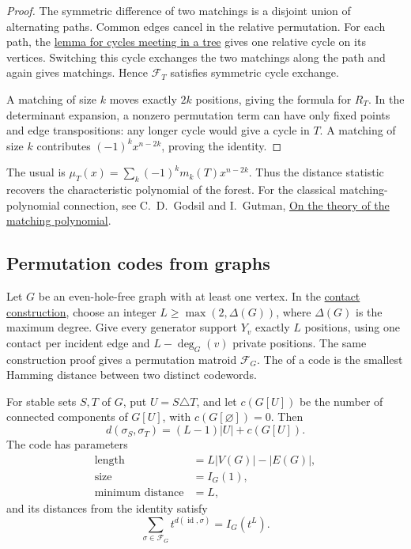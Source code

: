 \begin{proof}
The symmetric difference of two matchings is a disjoint union of
alternating paths. Common edges cancel in the relative permutation.
For each path, the \href{stable-sets.htm#contactConstruction}{lemma for
cycles meeting in a tree} gives one relative cycle on its vertices.
Switching this cycle
exchanges the two matchings along the path and again gives matchings.
Hence $\mathcal F_T$ satisfies symmetric cycle exchange.

A matching of size $k$ moves exactly $2k$ positions, giving the formula
for $R_T$. In the determinant expansion, a nonzero permutation term
can have only fixed points and edge transpositions: any longer cycle
would give a cycle in $T$. A matching of size $k$ contributes
$(-1)^kx^{n-2k}$, proving the identity.
\end{proof}

The usual  is
$\mu_T(x)=\sum_k(-1)^km_k(T)x^{n-2k}$. Thus the distance statistic
recovers the characteristic polynomial of the forest. For the classical
matching-polynomial connection, see C.~D.~Godsil and I.~Gutman,
\href{https://doi.org/10.1002/jgt.3190050203}{On the theory of the
matching polynomial}.

\subsection[graphPermutationCodes]{Permutation codes from graphs}

Let $G$ be an even-hole-free graph with at least one vertex. In the
\href{stable-sets.htm#contactConstruction}{contact construction}, choose
an integer $L\ge\max(2,\Delta(G))$, where $\Delta(G)$ is the maximum
degree. Give every generator support $Y_v$ exactly $L$ positions,
using one contact per incident edge and $L-\deg_G(v)$ private positions.
The same construction proof gives a permutation matroid $\mathcal F_G$.
The  of a code is the smallest Hamming distance
between two distinct codewords.

\begin{proposition}
For stable sets $S,T$ of $G$, put $U=S\triangle T$, and let $c(G[U])$
be the number of connected components of $G[U]$, with $c(G[\varnothing])=0$.
Then
\[
 d(\sigma_S,\sigma_T)=(L-1)|U|+c(G[U]).
\]
The code has parameters
\[
 \begin{aligned}
 \text{length}&=L|V(G)|-|E(G)|,\\
 \text{size}&=I_G(1),\\
 \text{minimum distance}&=L,
 \end{aligned}
\]
and its distances from the identity satisfy
\[
 \sum_{\sigma\in\mathcal F_G}
 t^{d(\operatorname{id},\sigma)}=I_G(t^L).
\]
\end{proposition}

